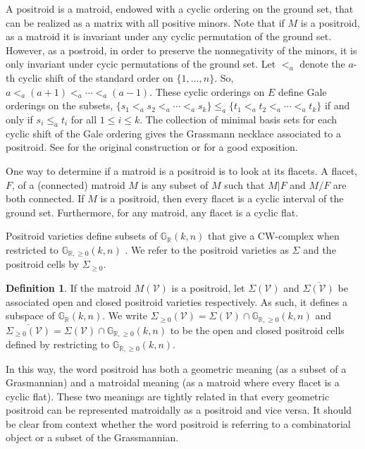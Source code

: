 \documentclass[11pt]{article}
\newcommand{\R}{\mathbb{R}}
\newcommand{\Gr}{\mathbb{G}_{\R, \geq 0}}
\newcommand{\Grall}{\mathbb{G}_{\R}}
\newcommand{\cV}{\mathcal{V}}
\newcommand{\Sigmapos}{\Sigma_{\geq 0}}
\theoremstyle{remark}
\theoremstyle{definition}
\newtheorem{dfn}[thm]{Definition}
\begin{document}
A positroid is a matroid, endowed with a cyclic ordering on the ground set, that can be realized as a matrix with all positive minors. Note that if $M$ is a positroid, as a matroid it is invariant under any cyclic permutation of the ground set. However, as a postroid, in order to  preserve the nonnegativity of the minors, it is only invariant under cycic permutations of the ground set. Let $<_a$ denote the $a$-th cyclic shift of the standard order on $\{1, \dots, n\}$. So, $a <_a (a+1) <_a \cdots <_a (a-1)$. These cyclic orderings on $E$ define Gale orderings on the subsets, $\{s_1 <_a s_2 <_a \cdots <_a s_k\} \leq_a \{t_1 <_a t_2 <_a \cdots <_a t_k\}$ if and only if $s_i \leq_a t_i$ for all $1 \leq i \leq k$. The collection of minimal basis sets for each cyclic shift of the Gale ordering gives the Grassmann necklace associated to a positroid. See \cite[Section 16]{Postnikov} for the original construction or \cite{positroids13} for a good exposition.

One way to determine if a matroid is a positroid is to look at its flacets. A flacet, $F$, of a (connected) matroid $M$ is any subset of $M$ such that $M|F$ and $M/F$ are both connected. If $M$ is a positroid, then every flacet is a cyclic interval of the ground set. Furthermore, for any matroid, any flacet is a cyclic flat.

Positroid varieties define subsets of $\Grall(k,n)$ that give a CW-complex when restricted to $\Gr(k,n)$ \cite[Section 3]{Postnikov}. We refer to the positroid varieties as $\Sigma$ and the positroid cells by  $\Sigmapos$.

\begin{dfn}If the matroid $M(\cV)$ is a positroid, let $\Sigma(\cV)$ and $\overline{\Sigma(\cV)}$ be associated open and closed positroid varieties respectively. As such, it defines a subspace of $\Grall(k,n)$. We write $\Sigmapos(\cV) = \Sigma(\cV) \cap \Gr(k,n)$ and $\overline{\Sigmapos(\cV)} = \Sigma(\cV) \cap \Gr(k,n)$ to be the open and closed positroid cells defined by restricting to $\Gr(k,n)$. \end{dfn} 

In this way, the word positroid has both a geometric meaning (as a subset of a Grasmannian) and a matroidal meaning (as a matroid where every flacet is a cyclic flat). These two meanings are tightly related in that every geometric positroid can be represented matroidally as a positroid and vice versa. It should be clear from context whether the word positroid is referring to a combinatorial object or a subset of the Grassmannian. %
\end{document}
